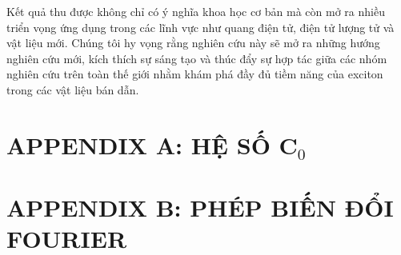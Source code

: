 \documentclass[%
 reprint,
 amsmath,amssymb,
 aps,
]{revtex4-2}
\begin{document}
Kết quả thu được không chỉ có ý nghĩa khoa học cơ bản mà còn mở ra nhiều triển vọng ứng dụng trong các lĩnh vực như quang điện tử, điện tử lượng tử và vật liệu mới. Chúng tôi hy vọng rằng nghiên cứu này sẽ mở ra những hướng nghiên cứu mới, kích thích sự sáng tạo và thúc đẩy sự hợp tác giữa các nhóm nghiên cứu trên toàn thế giới nhằm khám phá đầy đủ tiềm năng của exciton trong các vật liệu bán dẫn.
\section{\label{sec:level5} APPENDIX A: HỆ SỐ $\mathbf{C}_0$}
\section{\label{sec:level6} APPENDIX B: PHÉP BIẾN ĐỔI FOURIER}




\end{document}
